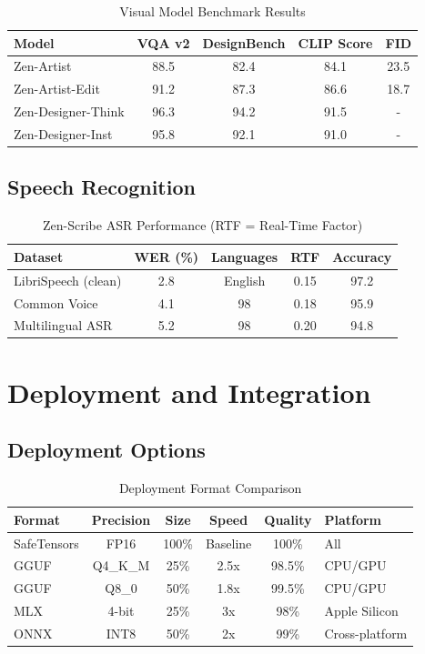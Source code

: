 \documentclass[11pt,a4paper]{article}
\begin{document}
\begin{table}[H]
\centering
\begin{tabular}{lcccc}
\toprule
\textbf{Model} & \textbf{VQA v2} & \textbf{DesignBench} & \textbf{CLIP Score} & \textbf{FID} \\
\midrule
Zen-Artist & 88.5 & 82.4 & 84.1 & 23.5 \\
Zen-Artist-Edit & 91.2 & 87.3 & 86.6 & 18.7 \\
Zen-Designer-Think & 96.3 & 94.2 & 91.5 & - \\
Zen-Designer-Inst & 95.8 & 92.1 & 91.0 & - \\
\bottomrule
\end{tabular}
\caption{Visual Model Benchmark Results}
\end{table}

\subsection{Speech Recognition}

\begin{table}[H]
\centering
\begin{tabular}{lcccc}
\toprule
\textbf{Dataset} & \textbf{WER (\%)} & \textbf{Languages} & \textbf{RTF} & \textbf{Accuracy} \\
\midrule
LibriSpeech (clean) & 2.8 & English & 0.15 & 97.2 \\
Common Voice & 4.1 & 98 & 0.18 & 95.9 \\
Multilingual ASR & 5.2 & 98 & 0.20 & 94.8 \\
\bottomrule
\end{tabular}
\caption{Zen-Scribe ASR Performance (RTF = Real-Time Factor)}
\end{table}

\section{Deployment and Integration}

\subsection{Deployment Options}

\begin{table}[H]
\centering
\small
\begin{tabular}{lccccl}
\toprule
\textbf{Format} & \textbf{Precision} & \textbf{Size} & \textbf{Speed} & \textbf{Quality} & \textbf{Platform} \\
\midrule
SafeTensors & FP16 & 100\% & Baseline & 100\% & All \\
GGUF & Q4\_K\_M & 25\% & 2.5x & 98.5\% & CPU/GPU \\
GGUF & Q8\_0 & 50\% & 1.8x & 99.5\% & CPU/GPU \\
MLX & 4-bit & 25\% & 3x & 98\% & Apple Silicon \\
ONNX & INT8 & 50\% & 2x & 99\% & Cross-platform \\
\bottomrule
\end{tabular}
\caption{Deployment Format Comparison}
\end{table}
\end{document}
